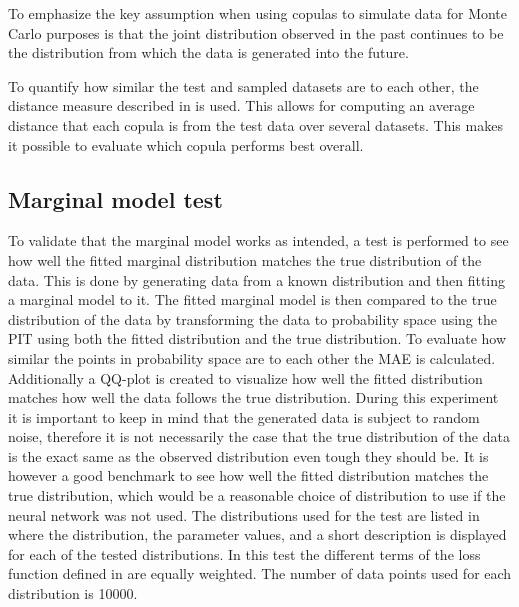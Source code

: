 To emphasize the key assumption when using copulas to simulate data for Monte Carlo purposes is that the joint distribution observed in the past continues to be the distribution from which the data is generated into the future. 

To quantify how similar the test and sampled datasets are to each other, the distance measure described in  is used. This allows for computing an average distance that each copula is from the test data over several datasets. This makes it possible to evaluate which copula performs best overall.  


\subsection{Marginal model test}
To validate that the marginal model works as intended, a test is performed to see how well the fitted marginal distribution matches the true distribution of the data. This is done by generating data from a known distribution and then fitting a marginal model to it. The fitted marginal model is then compared to the true distribution of the data by transforming the data to probability space using the \gls{PIT} using both the fitted distribution and the true distribution. To evaluate how similar the points in probability space are to each other the \gls{MAE} is calculated. Additionally a QQ-plot is created to visualize how well the fitted distribution matches how well the data follows the true distribution. During this experiment it is important to keep in mind that the generated data is subject to random noise, therefore it is not necessarily the case that the true distribution of the data is the exact same as the observed distribution even tough they should be. It is however a good benchmark to see how well the fitted distribution matches the true distribution, which would be a reasonable choice of distribution to use if the neural network was not used. The distributions used for the test are listed in  where the distribution, the parameter values, and a short description is displayed for each of the tested distributions. In this test the different terms of the loss function defined in  are equally weighted. The number of data points used for each distribution is 10000.

